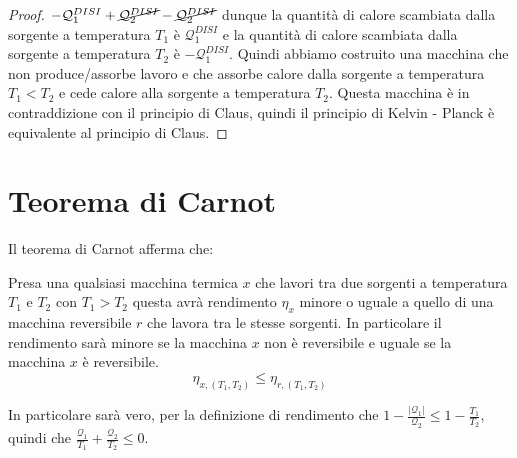 \begin{proof}
        $-\mathcal{Q}_1^{DISI} + \cancel{\mathcal{Q}_2^{DISI}} - \cancel{\mathcal{Q}_2^{DISI}}$ dunque la quantità di calore scambiata dalla sorgente a temperatura $T_1$ è $\mathcal{Q}_1^{DISI}$ e la quantità di calore scambiata dalla sorgente a temperatura $T_2$ è $-\mathcal{Q}_1^{DISI}$. Quindi abbiamo costruito una macchina che non produce/assorbe lavoro e che assorbe calore dalla sorgente a temperatura $T_1 < T_2$ e cede calore alla sorgente a temperatura $T_2$. Questa macchina è in contraddizione con il principio di Claus, quindi il principio di Kelvin - Planck è equivalente al principio di Claus.
    \end{proof}

\section{Teorema di Carnot}
    Il teorema di Carnot afferma che:
    \begin{theorem}
        Presa una qualsiasi macchina termica $x$ che lavori tra due sorgenti a temperatura $T_1$ e $T_2$ con $T_1 > T_2$ questa avrà rendimento $\eta_x$ minore o uguale a quello di una macchina reversibile $r$ che lavora tra le stesse sorgenti. In particolare il rendimento sarà minore se la macchina $x$ non è reversibile e uguale se la macchina $x$ è reversibile.
        \begin{equation}
            \eta_{x,(T_1,T_2)} \leq \eta_{r,(T_1,T_2)}
        \end{equation}
    \end{theorem}
    In particolare sarà vero, per la definizione di rendimento che $1-\frac{\left|\mathcal{Q}_1\right|}{\mathcal{Q}_2} \leq 1 - \frac{T_1}{T_2}$, quindi che $\frac{\mathcal{Q}_1}{T_1} + \frac{\mathcal{Q}_2}{T_2} \leq 0$.

